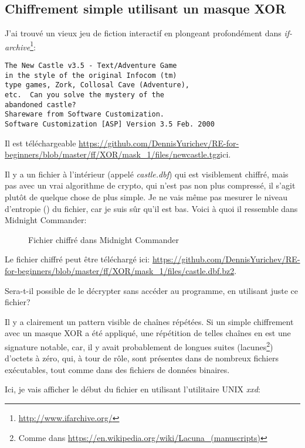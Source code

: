 \subsection{Chiffrement simple utilisant un masque XOR}
\label{XOR_mask_1}

J'ai trouvé un vieux jeu de fiction interactif en plongeant profondément dans \emph{if-archive}\footnote{\url{http://www.ifarchive.org/}}:

\begin{lstlisting}
The New Castle v3.5 - Text/Adventure Game
in the style of the original Infocom (tm)
type games, Zork, Collosal Cave (Adventure),
etc.  Can you solve the mystery of the
abandoned castle?
Shareware from Software Customization.
Software Customization [ASP] Version 3.5 Feb. 2000
\end{lstlisting}

Il est téléchargeable
\url{https://github.com/DennisYurichev/RE-for-beginners/blob/master/ff/XOR/mask_1/files/newcastle.tgz}{ici}.

Il y a un fichier à l'intérieur (appelé \emph{castle.dbf}) qui est visiblement chiffré,
mais pas avec un vrai algorithme de crypto, qui n'est pas non plus compressé, il
s'agit plutôt de quelque chose de plus simple.
Je ne vais même pas mesurer le niveau d'entropie () du fichier, car
je suis sûr qu'il est bas.
Voici à quoi il ressemble dans Midnight Commander:

\begin{figure}[H]
\centering
{}
\caption{Fichier chiffré dans Midnight Commander}
\end{figure}

Le fichier chiffré peut être téléchargé ici:
\url{https://github.com/DennisYurichev/RE-for-beginners/blob/master/ff/XOR/mask_1/files/castle.dbf.bz2}.

Sera-t-il possible de le décrypter sans accéder au programme, en utilisant juste ce
fichier?

Il y a clairement un pattern visible de chaînes répétées.
Si un simple chiffrement avec un masque XOR a été appliqué, une répétition de telles
chaînes en est une signature notable, car, il y avait probablement de longues
suites (lacunes\footnote{Comme dans \url{https://en.wikipedia.org/wiki/Lacuna_(manuscripts)}})
d'octets à zéro, qui, à tour de rôle, sont présentes dans de nombreux
fichiers exécutables, tout comme dans des fichiers de données binaires.

Ici, je vais afficher le début du fichier en utilisant l'utilitaire UNIX \emph{xxd}:

